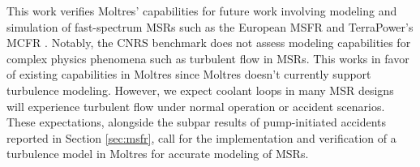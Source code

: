 This work verifies Moltres' capabilities for future work involving modeling and
simulation of fast-spectrum \glspl{MSR} such as the European \gls{MSFR} and
TerraPower's \gls{MCFR} \cite{terrapower_terrapower_2021}. Notably, the CNRS
benchmark does not assess modeling capabilities for complex physics phenomena
such as turbulent flow in \glspl{MSR}. This works in favor of existing
capabilities in Moltres since Moltres doesn't currently support turbulence
modeling. However, we expect coolant loops in many \gls{MSR} designs will
experience turbulent flow under normal operation or accident scenarios.
These expectations, alongside the subpar results of pump-initiated accidents
reported in Section \ref{sec:msfr}, call for the implementation and
verification of a turbulence model in Moltres for accurate modeling of
\glspl{MSR}.

\FloatBarrier
